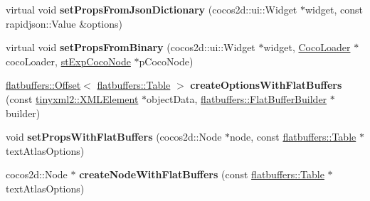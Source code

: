 \begin{DoxyCompactItemize}
virtual void {\bfseries set\+Props\+From\+Json\+Dictionary} (cocos2d\+::ui\+::\+Widget $\ast$widget, const rapidjson\+::\+Value \&options)
\item 
\mbox{\label{classcocostudio_1_1TextAtlasReader_ae8b72be4347cb64d907cf497e4e70ac6}} 
virtual void {\bfseries set\+Props\+From\+Binary} (cocos2d\+::ui\+::\+Widget $\ast$widget, \hyperlink{classcocostudio_1_1CocoLoader}{Coco\+Loader} $\ast$coco\+Loader, \hyperlink{structcocostudio_1_1stExpCocoNode}{st\+Exp\+Coco\+Node} $\ast$p\+Coco\+Node)
\item 
\mbox{\label{classcocostudio_1_1TextAtlasReader_a7265d17fa6595ac7b060c7e00ac5715b}} 
\hyperlink{structflatbuffers_1_1Offset}{flatbuffers\+::\+Offset}$<$ \hyperlink{classflatbuffers_1_1Table}{flatbuffers\+::\+Table} $>$ {\bfseries create\+Options\+With\+Flat\+Buffers} (const \hyperlink{classtinyxml2_1_1XMLElement}{tinyxml2\+::\+X\+M\+L\+Element} $\ast$object\+Data, \hyperlink{classflatbuffers_1_1FlatBufferBuilder}{flatbuffers\+::\+Flat\+Buffer\+Builder} $\ast$builder)
\item 
\mbox{\label{classcocostudio_1_1TextAtlasReader_afb6e75370da30463b946d316755085ab}} 
void {\bfseries set\+Props\+With\+Flat\+Buffers} (cocos2d\+::\+Node $\ast$node, const \hyperlink{classflatbuffers_1_1Table}{flatbuffers\+::\+Table} $\ast$text\+Atlas\+Options)
\item 
\mbox{\label{classcocostudio_1_1TextAtlasReader_ad97ad615f6389f5257dd24c378cf346a}} 
cocos2d\+::\+Node $\ast$ {\bfseries create\+Node\+With\+Flat\+Buffers} (const \hyperlink{classflatbuffers_1_1Table}{flatbuffers\+::\+Table} $\ast$text\+Atlas\+Options)
\end{DoxyCompactItemize}
